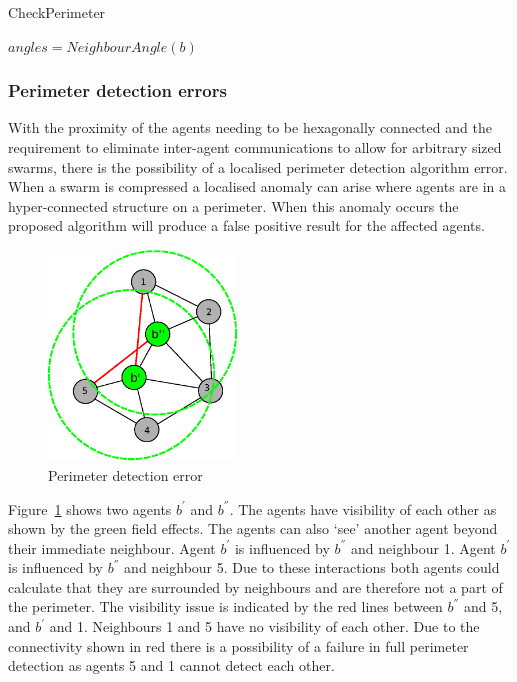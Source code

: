 \begin{algorithm}[H]
\DontPrintSemicolon
\SetAlgoLined
\caption{CheckPerimeter}
$angles = NeighbourAngle(b)$\;
\label{algo:checkPerimeter}
\end{algorithm}

\subsubsection{Perimeter detection errors\label{section:PerimeterErrorLocalisation}}
With the proximity of the agents needing to be hexagonally connected and the requirement to eliminate inter-agent communications to allow for arbitrary sized swarms, there is the possibility of a localised perimeter detection algorithm error. When a swarm is compressed a localised anomaly can arise where agents are in a hyper-connected structure on a perimeter. When this anomaly occurs the proposed algorithm will produce a false positive result for the affected agents. 

\begin{figure}[H]
\begin{center}
\includegraphics[width=5cm]{CHAPTER-6/figures/PerimeterError1}
\end{center}
\caption{Perimeter detection error\label{reduced:CompressedRangeError}}
\end{figure}

Figure~\ref{reduced:CompressedRangeError} shows two agents $b^{'}$ and $b^{''}$. The agents have visibility of each other as shown by the green field effects. The agents can also `see' another agent beyond their immediate neighbour. Agent $b^{'}$ is influenced by $b^{''}$ and neighbour 1. Agent $b^{'}$ is influenced by $b^{''}$ and neighbour 5. Due to these interactions both agents could calculate that they are surrounded by neighbours and are therefore not a part of the perimeter. The visibility issue is indicated by the red lines between $b^{''}$ and 5, and $b^{'}$ and 1. Neighbours 1 and 5 have no visibility of each other. Due to the connectivity shown in red there is a possibility of a failure in full perimeter detection as agents 5 and 1 cannot detect each other. 

